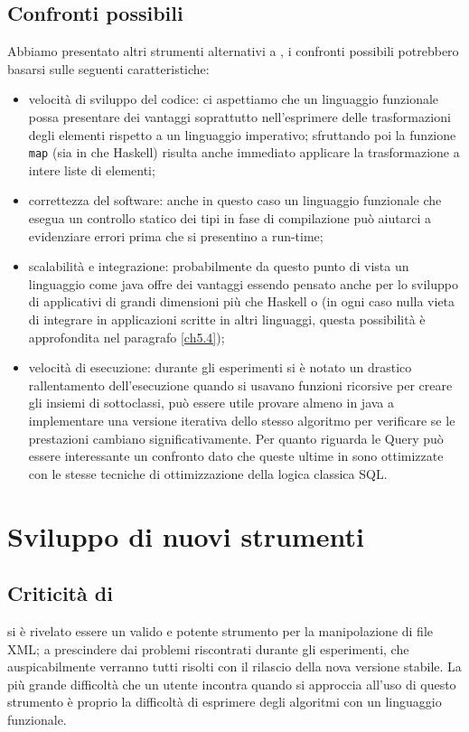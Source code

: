 \subsection{Confronti possibili}
Abbiamo presentato altri strumenti alternativi a \cduce, i confronti possibili potrebbero basarsi sulle seguenti caratteristiche:
\begin{itemize}
	\item velocità di sviluppo del codice: ci aspettiamo che un linguaggio funzionale possa presentare dei vantaggi soprattutto nell'esprimere delle trasformazioni degli elementi rispetto a un linguaggio imperativo; sfruttando poi la funzione \verb|map| (sia in \cduce che Haskell) risulta anche immediato applicare la trasformazione a intere liste di elementi;
	\item correttezza del software: anche in questo caso un linguaggio funzionale che esegua un controllo statico dei tipi in fase di compilazione può aiutarci a evidenziare errori prima che si presentino a run-time;
	\item scalabilità e integrazione: probabilmente da questo punto di vista un linguaggio come java offre dei vantaggi essendo pensato anche per lo sviluppo di applicativi di grandi dimensioni più che Haskell o \cduce (in ogni caso nulla vieta di integrare \cduce in applicazioni scritte in altri linguaggi, questa possibilità è approfondita nel paragrafo \ref{ch5.4});
	\item  velocità di esecuzione: durante gli esperimenti si è notato un drastico rallentamento dell'esecuzione quando si usavano funzioni ricorsive per creare gli insiemi di sottoclassi, può essere utile provare almeno in java a implementare una versione iterativa dello stesso algoritmo per verificare se le prestazioni cambiano significativamente. Per quanto riguarda le Query può essere interessante un confronto dato che queste ultime in \cduce sono ottimizzate con le stesse tecniche di ottimizzazione della logica classica SQL.
\end{itemize}
\section{Sviluppo di nuovi strumenti}
\subsection{Criticità di \cduce}
\cduce si è rivelato essere un valido e potente strumento per la manipolazione di file XML; a prescindere dai problemi riscontrati durante gli esperimenti, che auspicabilmente verranno tutti risolti con il rilascio della nova versione stabile. La più grande difficoltà che un utente incontra quando si approccia all'uso di questo strumento è proprio la difficoltà di esprimere degli algoritmi con un linguaggio funzionale.


